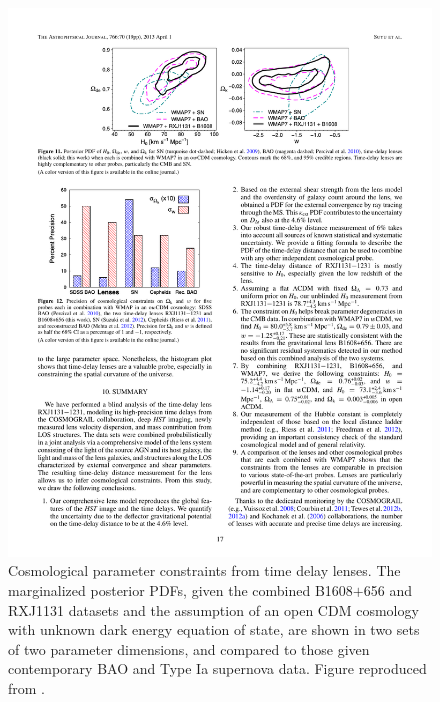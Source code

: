 \begin{figure}[!ht]
\centering\includegraphics[width=0.9\linewidth]{figures/Suyu13_fig11.pdf}
\caption{Cosmological parameter constraints from time delay
lenses. The marginalized posterior PDFs, given the combined B1608$+$656
and RXJ1131 datasets and the assumption of an open CDM cosmology with
unknown dark energy equation of state, are shown in
two sets of two parameter dimensions,
and compared to those given contemporary BAO and Type Ia supernova data.
Figure reproduced from \citet{Suy++14}.}
\label{fig:current-constraints}
\end{figure}

